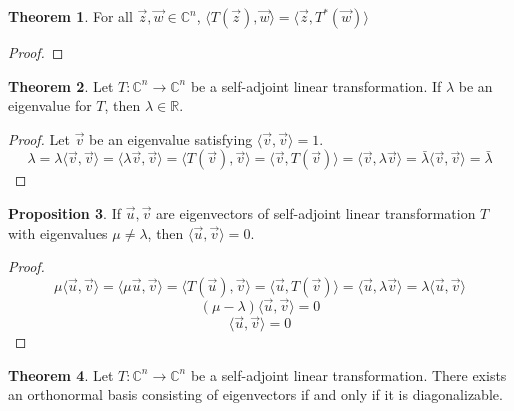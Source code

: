 \documentclass{article}
\theoremstyle{definition}
\newtheorem{theorem}{Theorem}[section]
\newtheorem{proposition}[theorem]{Proposition}
\theoremstyle{remark}
\begin{document}
\begin{theorem}
    For all $\vec{z},\vec{w}\in\mathbb{C}^n$, $\langle T(\vec{z}),\vec{w}\rangle=\langle \vec{z},T^*(\vec{w})\rangle$
\end{theorem}

\begin{proof}
    
\end{proof}

\begin{theorem}
    Let $T:\mathbb{C}^n\rightarrow\mathbb{C}^n$ be a self-adjoint linear transformation. 
    If $\lambda$ be an eigenvalue for $T$, then $\lambda\in\mathbb{R}$.
\end{theorem}

\begin{proof}
    Let $\vec{v}$ be an eigenvalue satisfying $\langle\vec{v},\vec{v}\rangle=1$.
    \[
    \lambda=\lambda\langle\vec{v},\vec{v}\rangle=\langle\lambda\vec{v},\vec{v}\rangle=\langle T(\vec{v}),\vec{v}\rangle=\langle\vec{v},T(\vec{v})\rangle=\langle\vec{v},\lambda\vec{v}\rangle=\bar{\lambda}\langle\vec{v},\vec{v}\rangle=\bar{\lambda}
    \]
\end{proof}

\begin{proposition}
    If $\vec{u},\vec{v}$ are eigenvectors of self-adjoint linear transformation $T$ with eigenvalues $\mu\neq\lambda$, then $\langle\vec{u},\vec{v}\rangle=0$.
\end{proposition}

\begin{proof}
    \[
    \mu \langle\vec{u},\vec{v}\rangle=\langle\mu\vec{u},\vec{v}\rangle=\langle T(\vec{u}),\vec{v}\rangle=\langle\vec{u},T(\vec{v})\rangle=\langle\vec{u},\lambda \vec{v}\rangle=\lambda\langle\vec{u},\vec{v}\rangle
    \]
    \[
    (\mu-\lambda)\langle\vec{u},\vec{v}\rangle=0
    \]
    \[
    \langle\vec{u},\vec{v}\rangle=0
    \]
\end{proof}

\begin{theorem}
    Let $T:\mathbb{C}^n\rightarrow\mathbb{C}^n$ be a self-adjoint linear transformation. There exists an orthonormal basis consisting of eigenvectors if and only if it is diagonalizable.
\end{theorem}
\end{document}
